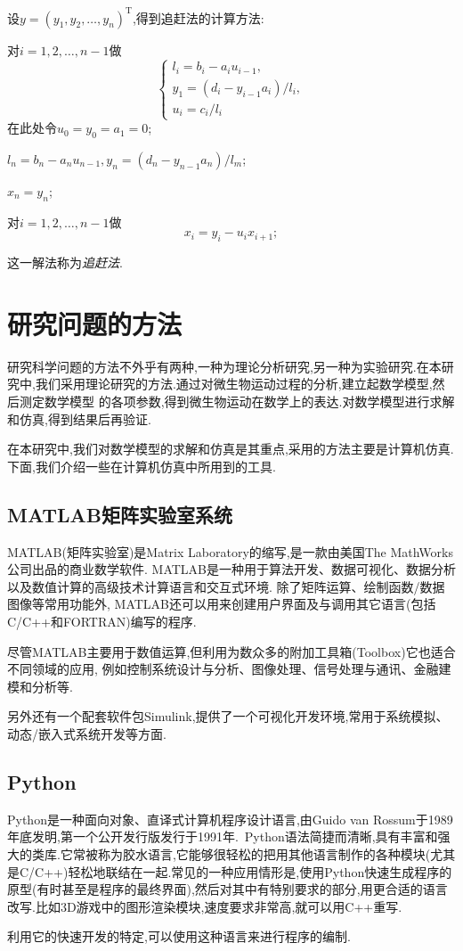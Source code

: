 \documentclass[a4paper,cs4size,adobefonts,fancyhdr]{ctexart}[2005/11/25]
\newcommand{\upcite}[1]{\textsuperscript{\textsuperscript{\cite{#1}}}}
\begin{document}
设$y=(y_1,y_2,\ldots,y_n)^{\mathrm{T}}$,得到追赶法的计算方法:
\begin{asparaenum}
\item 对$i=1,2,\ldots,n-1$做
\begin{equation*}
 \begin{cases}
 l_i=b_i-a_iu_{i-1},\\
 y_1=(d_i-y_{i-1}a_i)/l_i,\\
 u_i=c_i/l_i
 \end{cases}
\end{equation*}
在此处令$u_0=y_0=a_1=0$;
\item $l_n=b_n-a_n u_{n-1},y_n=(d_n-y_{n-1}a_n)/l_m$;
\item $x_n=y_n$;
\item 对$i=1,2,\ldots,n-1$做
\begin{equation*}
 x_i=y_i-u_i x_{i+1};
\end{equation*}
\end{asparaenum}\par
这一解法称为\emph{追赶法}.
\section{研究问题的方法}
研究科学问题的方法不外乎有两种,一种为理论分析研究,另一种为实验研究.在本研究中,我们采用理论研究的方法.通过对微生物运动过程的分析,建立起数学模型,然后测定数学模型
的各项参数,得到微生物运动在数学上的表达.对数学模型进行求解和仿真,得到结果后再验证.\par
在本研究中,我们对数学模型的求解和仿真是其重点,采用的方法主要是计算机仿真.下面,我们介绍一些在计算机仿真中所用到的工具\upcite{2004b}.
\subsection{MATLAB矩阵实验室系统}
MATLAB(矩阵实验室)是Matrix Laboratory的缩写,是一款由美国The MathWorks公司出品的商业数学软件.
MATLAB是一种用于算法开发、数据可视化、数据分析以及数值计算的高级技术计算语言和交互式环境.
除了矩阵运算、绘制函数/数据图像等常用功能外,
MATLAB还可以用来创建用户界面及与调用其它语言(包括C/C++和FORTRAN)编写的程序.\par
尽管MATLAB主要用于数值运算,但利用为数众多的附加工具箱(Toolbox)它也适合不同领域的应用,
例如控制系统设计与分析、图像处理、信号处理与通讯、金融建模和分析等.\par
另外还有一个配套软件包Simulink,提供了一个可视化开发环境,常用于系统模拟、动态/嵌入式系统开发等方面.
\subsection{Python}
Python是一种面向对象、直译式计算机程序设计语言,由Guido van Rossum于1989年底发明,第一个公开发行版发行于1991年.~Python语法简捷而清晰,具有丰富和强大的类库.它常被称为胶水语言,它能够很轻松的把用其他语言制作的各种模块(尤其是C/C++)轻松地联结在一起.常见的一种应用情形是,使用Python快速生成程序的原型(有时甚至是程序的最终界面),然后对其中有特别要求的部分,用更合适的语言改写.比如3D游戏中的图形渲染模块,速度要求非常高,就可以用C++重写.\par
利用它的快速开发的特定,可以使用这种语言来进行程序的编制.
\end{document}
